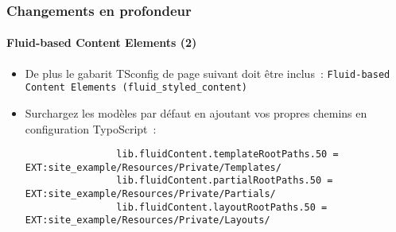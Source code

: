\begin{frame}[fragile]
	\frametitle{Changements en profondeur}
	\framesubtitle{Fluid-based Content Elements (2)}

	\lstset{basicstyle=\tiny\ttfamily}

	\begin{itemize}

		\item De plus le gabarit TSconfig de page suivant doit être inclus~:\newline
			\small
				\texttt{Fluid-based Content Elements (fluid\_styled\_content)}
			\normalsize

		\item Surchargez les modèles par défaut en ajoutant vos propres chemins en configuration TypoScript~:

			\begin{lstlisting}
				lib.fluidContent.templateRootPaths.50 = EXT:site_example/Resources/Private/Templates/
				lib.fluidContent.partialRootPaths.50 = EXT:site_example/Resources/Private/Partials/
				lib.fluidContent.layoutRootPaths.50 = EXT:site_example/Resources/Private/Layouts/
			\end{lstlisting}

	\end{itemize}

\end{frame}


